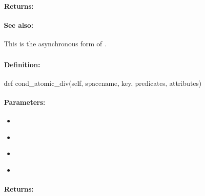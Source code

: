 \paragraph{Returns:}


\paragraph{See also:}  This is the asynchronous form of .

\pagebreak
\subsubsection{}
\label{api:python:cond_atomic_div}


\paragraph{Definition:}
\begin{pythoncode}
def cond_atomic_div(self, spacename, key, predicates, attributes)
\end{pythoncode}

\paragraph{Parameters:}
\begin{itemize}[noitemsep]
\item {}\\

\item {}\\

\item {}\\

\item {}\\

\end{itemize}

\paragraph{Returns:}


